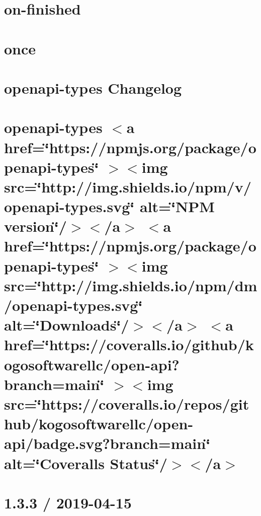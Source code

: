 \documentclass[twoside]{book}
\newcommand{\+}{\discretionary{\mbox{\scriptsize$\hookleftarrow$}}{}{}}
\begin{document}
\chapter{on-\/finished}
\label{md_src_nodejs_node_modules_on_finished_README}

\chapter{once}
\label{md_src_nodejs_node_modules_once_README}

\chapter{openapi-\/types Changelog}
\label{md_src_nodejs_node_modules_openapi_types_CHANGELOG}

\chapter{openapi-\/types \texorpdfstring{$<$}{<}a href=\char`\"{}https\+://npmjs.\+org/package/openapi-\/types\char`\"{} \texorpdfstring{$>$}{>}\texorpdfstring{$<$}{<}img src=\char`\"{}http\+://img.\+shields.\+io/npm/v/openapi-\/types.\+svg\char`\"{} alt=\char`\"{}\+NPM version\char`\"{}/\texorpdfstring{$>$}{>}\texorpdfstring{$<$}{<}/a\texorpdfstring{$>$}{>} \texorpdfstring{$<$}{<}a href=\char`\"{}https\+://npmjs.\+org/package/openapi-\/types\char`\"{} \texorpdfstring{$>$}{>}\texorpdfstring{$<$}{<}img src=\char`\"{}http\+://img.\+shields.\+io/npm/dm/openapi-\/types.\+svg\char`\"{} alt=\char`\"{}\+Downloads\char`\"{}/\texorpdfstring{$>$}{>}\texorpdfstring{$<$}{<}/a\texorpdfstring{$>$}{>} \texorpdfstring{$<$}{<}a href=\char`\"{}https\+://coveralls.\+io/github/kogosoftwarellc/open-\/api?branch=main\char`\"{} \texorpdfstring{$>$}{>}\texorpdfstring{$<$}{<}img src=\char`\"{}https\+://coveralls.\+io/repos/github/kogosoftwarellc/open-\/api/badge.\+svg?branch=main\char`\"{} alt=\char`\"{}\+Coveralls Status\char`\"{}/\texorpdfstring{$>$}{>}\texorpdfstring{$<$}{<}/a\texorpdfstring{$>$}{>}}
\label{md_src_nodejs_node_modules_openapi_types_README}

\chapter{1.3.3 / 2019-\/04-\/15}
\label{md_src_nodejs_node_modules_parseurl_HISTORY}

\end{document}
